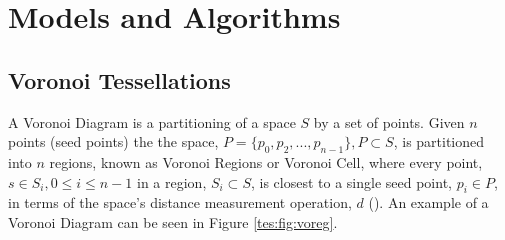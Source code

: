 \section{Models and Algorithms}\label{tes}
\subsection{Voronoi Tessellations}\label{tes:sec:vor}
A Voronoi Diagram is a partitioning of a space $S$ by a set of points. Given $n$ points (seed points) the the space, $P = \{p_0,p_2,...,p_{n-1}\}, P \subset S$, is partitioned into $n$ regions, known as Voronoi Regions or Voronoi Cell, where every point, $s \in S_i,0 \leq i \leq n-1$ in a region, $S_i \subset S$, is closest to a single seed point, $p_i \in P$, in terms of the space's distance measurement operation, $d$ (\cite{okabe2009spatial}). An example of a Voronoi Diagram can be seen in Figure \ref{tes:fig:voreg}.
%
